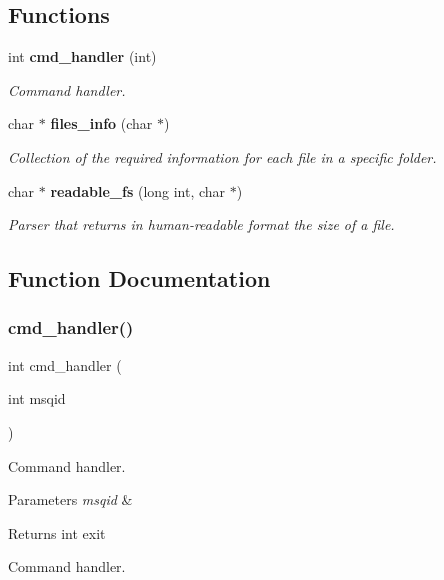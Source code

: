 \subsection*{Functions}
\begin{DoxyCompactItemize}
\item 
int \textbf{ cmd\+\_\+handler} (int)
\begin{DoxyCompactList}\small\item\em Command handler. \end{DoxyCompactList}\item 
char $\ast$ \textbf{ files\+\_\+info} (char $\ast$)
\begin{DoxyCompactList}\small\item\em Collection of the required information for each file in a specific folder. \end{DoxyCompactList}\item 
char $\ast$ \textbf{ readable\+\_\+fs} (long int, char $\ast$)
\begin{DoxyCompactList}\small\item\em Parser that returns in human-\/readable format the size of a file. \end{DoxyCompactList}\end{DoxyCompactItemize}


\subsection{Function Documentation}
\mbox{\label{fileserv_8h_a17e3a23bd1ae378882eab0ef0f856de1}} 
\subsubsection{cmd\+\_\+handler()}
{\footnotesize\ttfamily int cmd\+\_\+handler (\begin{DoxyParamCaption}\item[{int}]{msqid }\end{DoxyParamCaption})}



Command handler. 


\begin{DoxyParams}{Parameters}
{\em msqid} & \\
\hline
\end{DoxyParams}
\begin{DoxyReturn}{Returns}
int exit
\end{DoxyReturn}
Command handler.


